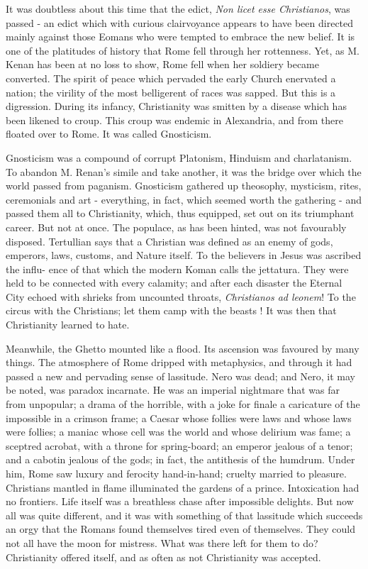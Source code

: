 \documentclass[]{book}
\begin{document}
It was doubtless about this time that the edict, \emph{Non licet esse
Christianos}, was passed - an edict which with curious clairvoyance
appears to have been directed mainly against those Eomans who were
tempted to embrace the new belief. It is one of the platitudes of
history that Rome fell through her rottenness. Yet, as M. Kenan has been
at no loss to show, Rome fell when her soldiery became converted. The
spirit of peace which pervaded the early Church enervated a nation; the
virility of the most belligerent of races was sapped. But this is a
digression. During its infancy, Christianity was smitten by a disease
which has been likened to croup. This croup was endemic in Alexandria,
and from there floated over to Rome. It was called Gnosticism.

Gnosticism was a compound of corrupt Platonism, Hinduism and
charlatanism. To abandon M. Renan's simile and take another, it was the
bridge over which the world passed from paganism. Gnosticism gathered up
theosophy, mysticism, rites, ceremonials and art - everything, in fact,
which seemed worth the gathering - and passed them all to Christianity,
which, thus equipped, set out on its triumphant career. But not at once.
The populace, as has been hinted, was not favourably disposed.
Tertullian says that a Christian was defined as an enemy of gods,
emperors, laws, customs, and Nature itself. To the believers in Jesus
was ascribed the influ- ence of that which the modern Koman calls the
jettatura. They were held to be connected with every calamity; and after
each disaster the Eternal City echoed with shrieks from uncounted
throats, \emph{Christianos ad leonem}! To the circus with the
Christians; let them camp with the beasts ! It was then that
Christianity learned to hate.

Meanwhile, the Ghetto mounted like a flood. Its ascension was favoured
by many things. The atmosphere of Rome dripped with metaphysics, and
through it had passed a new and pervading sense of lassitude. Nero was
dead; and Nero, it may be noted, was paradox incarnate. He was an
imperial nightmare that was far from unpopular; a drama of the horrible,
with a joke for finale a caricature of the impossible in a crimson
frame; a Caesar whose follies were laws and whose laws were follies; a
maniac whose cell was the world and whose delirium was fame; a sceptred
acrobat, with a throne for spring-board; an emperor jealous of a tenor;
and a cabotin jealous of the gods; in fact, the antithesis of the
humdrum. Under him, Rome saw luxury and ferocity hand-in-hand; cruelty
married to pleasure. Christians mantled in flame illuminated the gardens
of a prince. Intoxication had no frontiers. Life itself was a breathless
chase after impossible delights. But now all was quite different, and it
was with something of that lassitude which succeeds an orgy that the
Romans found themselves tired even of themselves. They could not all
have the moon for mistress. What was there left for them to do?
Christianity offered itself, and as often as not Christianity was
accepted.
\end{document}

